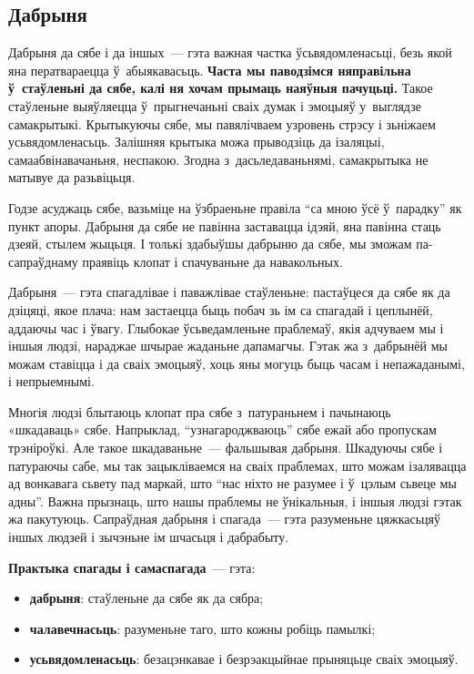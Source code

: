 \subsection*{Дабрыня}

Дабрыня да сябе і да іншых~--- гэта важная частка ўсьвядомленасьці, безь якой яна ператвараецца ў~абыякавасьць. \textbf{Часта мы паводзімся няправільна ў~стаўленьні да сябе, калі ня хочам прымаць наяўныя пачуцьці.} Такое стаўленьне выяўляецца ў~прыгнечаньні сваіх думак і эмоцыяў у~выглядзе самакрытыкі. Крытыкуючы сябе, мы павялічваем узровень стрэсу і зьніжаем усьвядомленасьць. Залішняя крытыка можа прыводзіць да ізаляцыі, самаабвінавачаньня, неспакою. Згодна з~дасьледаваньнямі, самакрытыка не матывуе да разьвіцьця.

Годзе асуджаць сябе, вазьміце на ўзбраеньне правіла ``са мною ўсё ў~парадку'' як пункт апоры. Дабрыня да сябе не павінна заставацца ідэяй, яна павінна стаць дзеяй, стылем жыцьця. І толькі здабыўшы дабрыню да сябе, мы зможам па-сапраўднаму праявіць клопат і спачуваньне да навакольных.

Дабрыня~--- гэта спагадлівае і паважлівае стаўленьне: пастаўцеся да сябе як да дзіцяці, якое плача: нам застаецца быць побач зь ім са спагадай і цеплынёй, аддаючы час і ўвагу. Глыбокае ўсьведамленьне праблемаў, якія адчуваем мы і іншыя людзі, нараджае шчырае жаданьне дапамагчы. Гэтак жа з~дабрынёй мы можам ставіцца і да сваіх эмоцыяў, хоць яны могуць быць часам і непажаданымі, і непрыемнымі.

Многія людзі блытаюць клопат пра сябе з~патураньнем і пачынаюць «шкадаваць» сябе. Напрыклад, ``узнагароджваюць'' сябе ежай або пропускам трэніроўкі. Але такое шкадаваньне~--- фальшывая дабрыня. Шкадуючы сябе і патураючы сабе, мы так зацыкліваемся на сваіх праблемах, што можам ізалявацца ад вонкавага сьвету пад маркай, што ``нас ніхто не разумее і ў~цэлым сьвеце мы адны''. Важна прызнаць, што нашы праблемы не ўнікальныя, і іншыя людзі гэтак жа пакутуюць. Сапраўдная дабрыня і спагада~--- гэта разуменьне цяжкасьцяў іншых людзей і зычэньне ім шчасьця і дабрабыту.

\textbf{Практыка спагады і самаспагада}~--- гэта: 
\begin{itemize}
  \item \textbf{дабрыня}: стаўленьне да сябе як да сябра;
  \item \textbf{чалавечнасьць}: разуменьне таго, што кожны робіць памылкі;
  \item \textbf{усьвядомленасьць}: безацэнкавае і безрэакцыйнае прыняцьце сваіх эмоцыяў.
\end{itemize}

